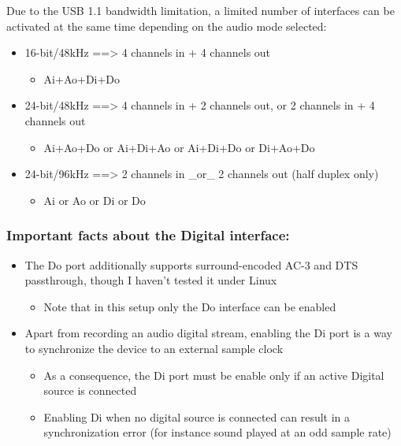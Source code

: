 \documentclass[a4paper,8pt,english]{sphinxmanual}
\begin{document}
Due to the USB 1.1 bandwidth limitation, a limited number of interfaces can be
activated at the same time depending on the audio mode selected:
\begin{itemize}
\item {} 
16-bit/48kHz ==\textgreater{} 4 channels in + 4 channels out
\begin{itemize}
\item {} 
Ai+Ao+Di+Do

\end{itemize}

\item {} 
24-bit/48kHz ==\textgreater{} 4 channels in + 2 channels out,
or 2 channels in + 4 channels out
\begin{itemize}
\item {} 
Ai+Ao+Do or Ai+Di+Ao or Ai+Di+Do or Di+Ao+Do

\end{itemize}

\item {} 
24-bit/96kHz ==\textgreater{} 2 channels in \_or\_ 2 channels out (half duplex only)
\begin{itemize}
\item {} 
Ai or Ao or Di or Do

\end{itemize}

\end{itemize}


\subsubsection{Important facts about the Digital interface:}
\label{sound/cards/audiophile-usb:important-facts-about-the-digital-interface}\begin{itemize}
\item {} 
The Do port additionally supports surround-encoded AC-3 and DTS passthrough,
though I haven't tested it under Linux
\begin{itemize}
\item {} 
Note that in this setup only the Do interface can be enabled

\end{itemize}

\item {} 
Apart from recording an audio digital stream, enabling the Di port is a way
to synchronize the device to an external sample clock
\begin{itemize}
\item {} 
As a consequence, the Di port must be enable only if an active Digital
source is connected

\item {} 
Enabling Di when no digital source is connected can result in a
synchronization error (for instance sound played at an odd sample rate)

\end{itemize}

\end{itemize}
\end{document}
